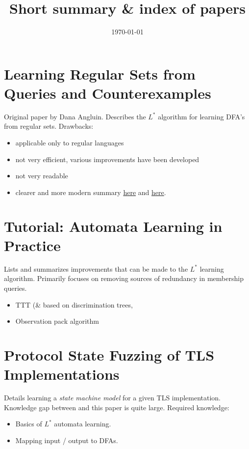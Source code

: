 \documentclass[11pt]{article}
\title{\textbf{Short summary \& index of papers}}
\author{}
\date{\today}
\begin{document}
\maketitle

\section{\cite{Angluin87} Learning Regular Sets from Queries and Counterexamples}
Original paper by Dana Angluin.
Describes the $L^*$ algorithm for learning DFA's from regular sets.
Drawbacks:
\begin{itemize}
  \item applicable only to regular languages
  \item not very efficient, various improvements have been developed
  \item not very readable
  \item clearer and more modern summary
        \href{https://www.cs.bgu.ac.il/~beimel/Courses/Learning/}{here} and
        \href{https://www.cs.bgu.ac.il/~beimel/Courses/Learning/lect3.ps}{here}.
\end{itemize}

\section{\cite{Howar14} Tutorial: Automata Learning in Practice}
Lists and summarizes improvements that can be made to the $L^*$ learning algorithm.
Primarily focuses on removing sources of redundancy in membership queries.
\begin{itemize}
  \item TTT (\& based on discrimination trees, \cite{} 
  \item Observation pack algorithm \todo{}
\end{itemize}

\section{\cite{deRuiter15} Protocol State Fuzzing of TLS Implementations}
Details learning a \textit{state machine model} for a given TLS implementation.
Knowledge gap between \cite{Angluin87} and this paper is quite large.
Required knowledge:
\begin{itemize}
  \item \cite{Angluin87} Basics of $L^*$ automata learning.
  \item \cite{Steffen12} Mapping input / output to DFAs.
\end{itemize}
\end{document}

